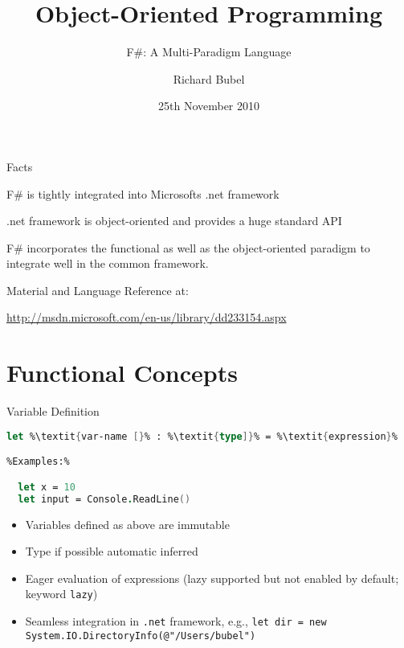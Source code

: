 \documentclass{beamer}
\title[]{Object-Oriented Programming}
\subtitle[F\#]{F\#: A Multi-Paradigm Language} %
\author[Richard Bubel] %
{Richard Bubel}
\institute[CTH]{Chalmers University of Technology}
\date{25th November 2010}%
\newcommand{\Blue}[1]{\color{blue}#1\color{black}\xspace}
\begin{document}
\begin{frame}
  \titlepage
\end{frame}

\begin{frame}{Facts}

\Blue{F\# is tightly integrated into Microsofts \textsf{.net} framework}

\bigskip

\Blue{\textsf{.net} framework is object-oriented and provides a huge standard API}

\bigskip

\Blue{F\# incorporates the functional as well as the object-oriented
paradigm to integrate well in the common framework.}

\bigskip\bigskip

Material and Language Reference at:

{\small \url{http://msdn.microsoft.com/en-us/library/dd233154.aspx}}

\end{frame}

\section{Functional Concepts}

\begin{frame}[fragile]{Variable Definition}
\begin{lstlisting}[language=FSharp, escapechar=\%]
  let %\textit{var-name [}% : %\textit{type]}% = %\textit{expression}%

%Examples:%

  let x = 10
  let input = Console.ReadLine()

\end{lstlisting}
  
\begin{itemize}
\item Variables defined as above are immutable
\item Type if possible automatic inferred
\item Eager evaluation of expressions (lazy supported but not enabled
  by default; keyword \lstinline!lazy!)
\item Seamless integration in \texttt{.net} framework, e.g.,
  \lstinline!let dir = new System.IO.DirectoryInfo(@"/Users/bubel")!

 
\end{itemize}

\end{frame}
\end{document}
